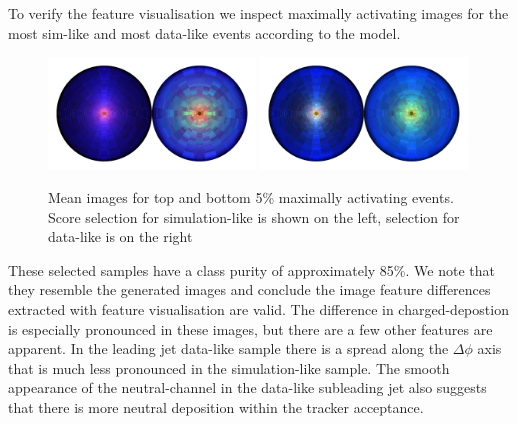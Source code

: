 To verify the feature visualisation we inspect maximally activating images for the most sim-like and most data-like events according to the model. 
\begin{figure}[h!]
    \begin{center}
        \includegraphics[width=0.49\textwidth]{figures/event_selection/zee_max_act_mean_sim.pdf}
        \includegraphics[width=0.49\textwidth]{figures/event_selection/zee_max_act_mean_data.pdf}
    \end{center}
    \caption{Mean images for top and bottom 5\% maximally activating events. 
             Score selection for simulation-like is shown on the left, selection for data-like is on the right}
    \label{fig:event_categorisation:zee_data_sim_max_act}
\end{figure}

These selected samples have a class purity of approximately 85\%.
We note that they resemble the generated images and conclude the image feature differences extracted with feature visualisation are valid. 
The difference in charged-\pt depostion is especially pronounced in these images, but there are a few other features are apparent. In the leading jet data-like sample there is a spread along the $\Delta\phi$ axis that is much less pronounced in the simulation-like sample. 
The smooth appearance of the neutral-\pt channel in the data-like subleading jet also suggests that there is more neutral deposition within the tracker acceptance. 




